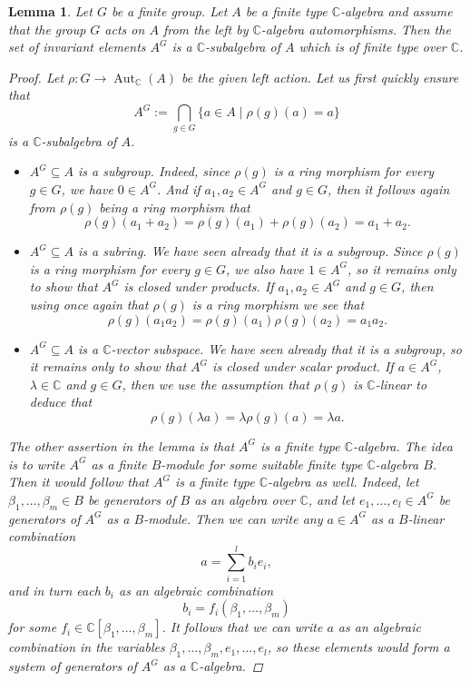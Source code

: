 \documentclass[12pt,a4paper]{amsart}
\theoremstyle{plain}
\newtheorem{lm}[thm]{Lemma}
\theoremstyle{definition}
\theoremstyle{remark}
\begin{document}
\begin{lm}\label{lm:finitetype}
  Let $G$ be a finite group.
  Let $A$ be a finite type $\mathbb{C}$-algebra and assume that the group $G$ acts on $A$ from the left by $\mathbb{C}$-algebra automorphisms.
  Then the set of invariant elements $A^{G}$ is a $\mathbb{C}$-subalgebra of $A$ which is of finite type over $\mathbb{C}$.

  \begin{proof}
    Let $\rho \colon G \to \operatorname{Aut}_{\mathbb{C}}(A)$ be the given left action.
    Let us first quickly ensure that
    \[ A^{G} := \bigcap_{g \in G} \{ a \in A \mid \rho(g)(a) = a \} \]
    is a $\mathbb{C}$-subalgebra of $A$.
    \begin{itemize}
      \item $A^{G} \subseteq A$ is a subgroup.
        Indeed, since $\rho(g)$ is a ring morphism for every $g \in G$, we have $0 \in A^{G}$.
        And if $a_{1}, a_{2} \in A^{G}$ and $g \in G$, then it follows again from $\rho(g)$ being a ring morphism that
        \[ \rho(g)(a_{1}+a_{2}) = \rho(g)(a_{1}) + \rho(g)(a_{2}) = a_{1} + a_{2}. \]
      \item $A^{G} \subseteq A$ is a subring.
        We have seen already that it is a subgroup.
        Since $\rho(g)$ is a ring morphism for every $g \in G$, we also have $1 \in A^{G}$, so it remains only to show that $A^{G}$ is closed under products.
        If $a_{1}, a_{2} \in A^{G}$ and $g \in G$, then using once again that $\rho(g)$ is a ring morphism we see that
        \[ \rho(g)(a_{1}a_{2}) = \rho(g)(a_{1})\rho(g)(a_{2}) = a_{1}a_{2}. \]
      \item $A^{G} \subseteq A$ is a $\mathbb{C}$-vector subspace.
        We have seen already that it is a subgroup, so it remains only to show that $A^{G}$ is closed under scalar product.
        If $a \in A^{G}$, $\lambda \in \mathbb{C}$ and $g \in G$, then we use the assumption that $\rho(g)$ is $\mathbb{C}$-linear to deduce that
        \[ \rho(g)(\lambda a) = \lambda \rho(g)(a) = \lambda a. \]
    \end{itemize}
    
    The other assertion in the lemma is that $A^{G}$ is a finite type $\mathbb{C}$-algebra.
    The idea is to write $A^{G}$ as a finite $B$-module for some suitable finite type $\mathbb{C}$-algebra $B$.
    Then it would follow that $A^{G}$ is a finite type $\mathbb{C}$-algebra as well.
    Indeed, let $\beta_{1}, \ldots, \beta_{m} \in B$ be generators of $B$ as an algebra over $\mathbb{C}$, and let $e_{1}, \ldots, e_{l} \in A^{G}$ be generators of $A^{G}$ as a $B$-module.
    Then we can write any $a \in A^{G}$ as a $B$-linear combination
    \[ a = \sum_{i = 1}^{l} b_{i}e_{i}, \]
    and in turn each $b_{i}$ as an algebraic combination
    \[ b_{i} = f_{i}(\beta_{1}, \ldots, \beta_{m}) \]
    for some $f_{i} \in \mathbb{C}[\beta_{1}, \ldots, \beta_{m}]$.
    It follows that we can write $a$ as an algebraic combination in the variables $\beta_{1}, \ldots, \beta_{m}, e_{1}, \ldots, e_{l}$, so these elements would form a system of generators of $A^{G}$ as a $\mathbb{C}$-algebra.


\end{proof}
\end{lm}
\end{document}
